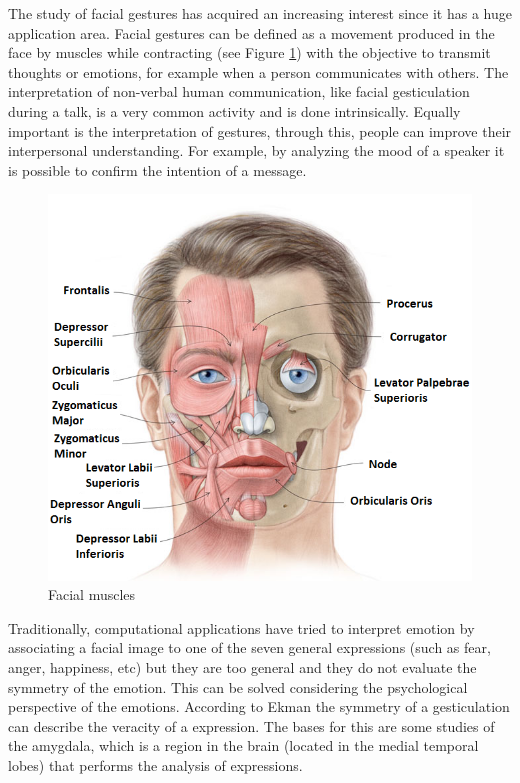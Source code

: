 The study of facial gestures has acquired an increasing interest since it has a huge application area. Facial gestures can be defined as a movement produced in the face by muscles while contracting (see Figure \ref{fig:Facial muscles}) with the objective to transmit thoughts or emotions, for example when a person communicates with others. The interpretation of non-verbal human communication, like facial gesticulation during a talk, is a very common activity and is done intrinsically. Equally important is the interpretation of gestures, through this, people can improve their interpersonal understanding. For example, by analyzing the mood of a speaker it is possible to confirm the intention of a message.

\begin{figure}[ht]
\centering
\includegraphics[scale=0.5]{images/Figure11FacialMuscles_name_2.png}
\caption{Facial muscles}
\label{fig:Facial muscles}
\end{figure}

Traditionally, computational applications have tried to interpret emotion by associating a facial image to one of the seven general expressions (such as fear, anger, happiness, etc) but they are too general and they do not evaluate the symmetry of the emotion. This can be solved considering the psychological perspective of the emotions. According to Ekman \cite{Hager1979} the symmetry of a gesticulation can describe the veracity of a expression. The bases for this are some studies of the amygdala, which is a region in the brain (located in the medial temporal lobes) that performs the analysis of expressions.

